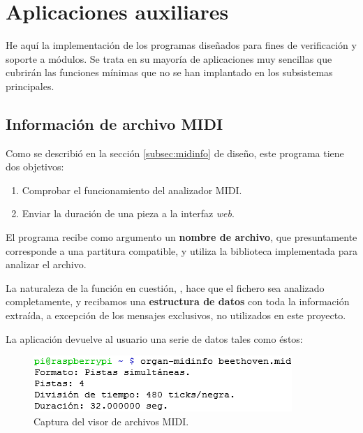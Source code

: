 \smallskip

\section{Aplicaciones auxiliares}

He aquí la implementación de los programas diseñados para fines de verificación y soporte a módulos. Se trata en su mayoría de aplicaciones muy sencillas que cubrirán las funciones mínimas que no se han implantado en los subsistemas principales.

\subsection{Información de archivo MIDI}

Como se describió en la sección \ref{subsec:midinfo} de diseño, este programa tiene dos objetivos:

\begin{enumerate}
	\item Comprobar el funcionamiento del analizador \acrshort{MIDI}.
	\item Enviar la duración de una pieza a la interfaz \textit{web}.
\end{enumerate}

El programa recibe como argumento un \textbf{nombre de archivo}, que presuntamente corresponde a una partitura compatible, y utiliza la biblioteca implementada para analizar el archivo.

La naturaleza de la función en cuestión, , hace que el fichero sea analizado completamente, y recibamos una \textbf{estructura de datos} con toda la información extraída, a excepción de los mensajes exclusivos, no utilizados en este proyecto.

La aplicación devuelve al usuario una serie de datos tales como éstos:

\smallskip

\begin{figure}[H]
	\noindent \begin{centering}
		\includegraphics[width=\linewidth/2]{capitulo5/cap_midinfo}
		\par\end{centering}
	\smallskip
	\caption{\label{fig:cap_midinfo} Captura del visor de archivos MIDI.}
\end{figure} 


